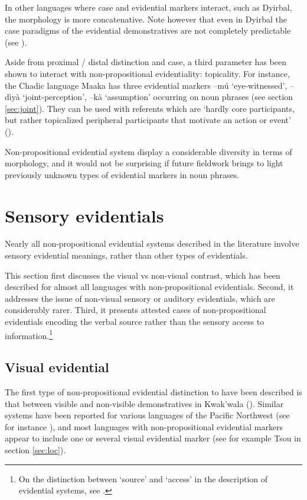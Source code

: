 \documentclass[oneside,a4paper,11pt]{article}
\newcommand{\ipa}[1]{{\phon \mbox{#1}}} %
\begin{document}
In other languages where case and evidential markers interact, such as Dyirbal, the morphology is more concatenative. Note however that even in Dyirbal the case paradigms of the evidential demonstratives are not completely predictable (see \citealt{dixon14nonvisible}).

Aside from proximal / distal distinction and case, a third parameter has been shown to interact with non-propositional evidentiality: topicality. For instance,  the Chadic language Maaka has three evidential markers \ipa{--mú} `eye-witnessed', \ipa{--dìyà} `joint-perception', \ipa{--kà} `assumption' occurring on noun phrases (see section \ref{sec:joint}). They can be used with referents which are `hardly core participants, but rather topicalized peripheral participants that motivate an action or event' (\citealt[195-7]{storch14maaka}).

 

Non-propositional evidential system display a considerable diversity in terms of morphology, and it would not be surprising if future fieldwork brings to light previously unknown types of evidential markers in noun phrases.

\section{Sensory evidentials} \label{sec:sensory}
Nearly all non-propositional evidential systems described in the literature involve sensory evidential meanings, rather than other types of evidentials. 

This section first discusses the visual vs non-visual contrast, which has been described for almost all languages with non-propositional evidentials. Second, it addresses the issue of non-visual sensory or auditory evidentials, which are considerably rarer. Third, it presents attested cases of non-propositional evidentials encoding the verbal source rather than the sensory access to information.\footnote{On the distinction between `source' and `access' in the description of evidential systems, see \citet{tournadre14evidentiality}.}

\subsection{Visual evidential} \label{sec:visible}
The first type of non-propositional evidential distinction to have been described  is that between visible and non-visible demonstratives in Kwak'wala (\citealt[527-531]{boas11kwakiutl}). Similar systems have been reported for various languages of the Pacific Northwest (see for instance \citealt{bach06deixis.wakashan}), and most languages with non-propositional evidential markers appear to include one or several visual evidential marker (see for example Tsou in section \ref{sec:loc}).  
\end{document}
